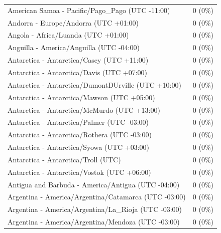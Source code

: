 \begin{appendix}
\begin{table}
{\begin{tabular}[t]{ll}
\hspace{1em}American Samoa - Pacific/Pago\_Pago (UTC -11:00) & 0 (0\%)\\
\hspace{1em}Andorra - Europe/Andorra (UTC +01:00) & 0 (0\%)\\
\hspace{1em}Angola - Africa/Luanda (UTC +01:00) & 0 (0\%)\\
\addlinespace
\hspace{1em}Anguilla - America/Anguilla (UTC -04:00) & 0 (0\%)\\
\hspace{1em}Antarctica - Antarctica/Casey (UTC +11:00) & 0 (0\%)\\
\hspace{1em}Antarctica - Antarctica/Davis (UTC +07:00) & 0 (0\%)\\
\hspace{1em}Antarctica - Antarctica/DumontDUrville (UTC +10:00) & 0 (0\%)\\
\hspace{1em}Antarctica - Antarctica/Mawson (UTC +05:00) & 0 (0\%)\\
\addlinespace
\hspace{1em}Antarctica - Antarctica/McMurdo (UTC +13:00) & 0 (0\%)\\
\hspace{1em}Antarctica - Antarctica/Palmer (UTC -03:00) & 0 (0\%)\\
\hspace{1em}Antarctica - Antarctica/Rothera (UTC -03:00) & 0 (0\%)\\
\hspace{1em}Antarctica - Antarctica/Syowa (UTC +03:00) & 0 (0\%)\\
\hspace{1em}Antarctica - Antarctica/Troll (UTC) & 0 (0\%)\\
\addlinespace
\hspace{1em}Antarctica - Antarctica/Vostok (UTC +06:00) & 0 (0\%)\\
\hspace{1em}Antigua and Barbuda - America/Antigua (UTC -04:00) & 0 (0\%)\\
\hspace{1em}Argentina - America/Argentina/Catamarca (UTC -03:00) & 0 (0\%)\\
\hspace{1em}Argentina - America/Argentina/La\_Rioja (UTC -03:00) & 0 (0\%)\\
\hspace{1em}Argentina - America/Argentina/Mendoza (UTC -03:00) & 0 (0\%)\\

\end{tabular}}
\end{table}
\end{appendix}
